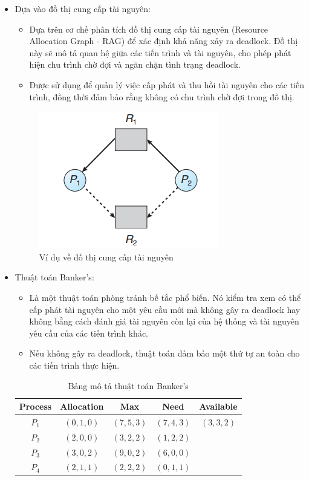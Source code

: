 \documentclass[12pt]{report}
\begin{document}
\begin{itemize}
	\item Dựa vào đồ thị cung cấp tài nguyên:
	      \begin{itemize}
	      	\item Dựa trên cơ chế phân tích đồ thị cung cấp tài nguyên (Resource Allocation Graph - RAG) để xác định khả năng xảy ra deadlock. Đồ thị này sẽ mô tả quan hệ giữa các tiến trình và tài nguyên, cho phép phát hiện chu trình chờ đợi và ngăn chặn tình trạng deadlock.
	      	\item Được sử dụng để quản lý việc cấp phát và thu hồi tài nguyên cho các tiến trình, đồng thời đảm bảo rằng không có chu trình chờ đợi trong đồ thị.
	      \end{itemize}
	      \begin{figure}[ht]
	      	\centering
	      	\includegraphics{resources/rag.png}
	      	\caption{Ví dụ về đồ thị cung cấp tài nguyên}
	      	\label{fig:enter-label}
	      \end{figure}
	          
	\item Thuật toán Banker's: 
	      \begin{itemize}
	      	\item Là một thuật toán phòng tránh bế tắc phổ biến. Nó kiểm tra xem có thể cấp phát tài nguyên cho một yêu cầu mới mà không gây ra deadlock hay không bằng cách đánh giá tài nguyên còn lại của hệ thống và tài nguyên yêu cầu của các tiến trình khác.
	      	\item Nếu không gây ra deadlock, thuật toán đảm bảo một thứ tự an toàn cho các tiến trình thực hiện.
	      \end{itemize}
	      \begin{table}[htbp]
	      	\centering
	      	\begin{tabular}{|c|c|c|c|c|}
	      		\hline
	      		Process & Allocation  & Max         & Need        & Available   \\
	      		\hline
	      		$P_1$   & $(0, 1, 0)$ & $(7, 5, 3)$ & $(7, 4, 3)$ & $(3, 3, 2)$ \\
	      		$P_2$   & $(2, 0, 0)$ & $(3, 2, 2)$ & $(1, 2, 2)$ &             \\
	      		$P_3$   & $(3, 0, 2)$ & $(9, 0, 2)$ & $(6, 0, 0)$ &             \\
	      		$P_4$   & $(2, 1, 1)$ & $(2, 2, 2)$ & $(0, 1, 1)$ &             \\
	      		\hline
	      	\end{tabular}
	      	\caption{Bảng mô tả thuật toán Banker's}
	      \end{table}
\end{itemize}
\end{document}
